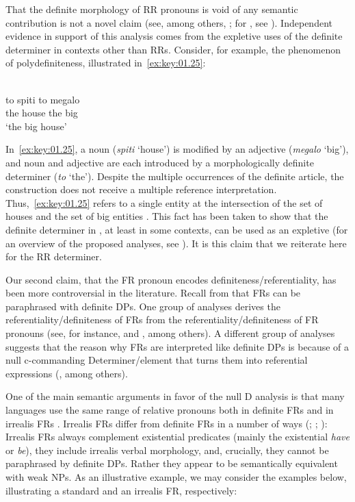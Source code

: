 \documentclass[output=paper]{langsci/langscibook}
\begin{document}
That the definite morphology of \gls{RR} pronouns is void of any semantic
contribution is not a novel claim (see, among others,
\citealt[80]{Bianchi1999}; for , see \citealt{Alexiadou1998}). Independent
evidence in support of this analysis comes from the expletive uses of the 
definite determiner in contexts other than \glspl{RR}.  Consider, for example, the
phenomenon of polydefiniteness, illustrated in~\eqref{ex:key:01.25}:

\ea {}\label{ex:key:01.25}\\
	\gll to    spiti   to   megalo\\
		the house the big\\
    \trans \enquote*{the big house}
\z

In~\eqref{ex:key:01.25}, a noun (\emph{spiti} ‘house’) is modified by an adjective
(\emph{megalo} ‘big’), and noun and adjective are each introduced by a
morphologically definite determiner (\emph{to} ‘the’).  Despite the multiple
occurrences of the definite article, the construction does not receive a
multiple reference interpretation. Thus,~\eqref{ex:key:01.25} refers to a single entity at the
intersection of the set of houses and the set of big entities
\parencite{LekSze2012}. This fact has been taken to show that the definite
determiner in , at least in some contexts, can be used as an expletive
(for an overview of the proposed analyses, see \citealt{Alexiadou2014b}). It is
this claim that we reiterate here for the \gls{RR} determiner.

Our second claim, that the \gls{FR} pronoun encodes
definiteness/referentiality, has been more controversial in the literature.
Recall from  that \glspl{FR} can be paraphrased with
definite DPs. One group of analyses derives the referentiality/definiteness of
\glspl{FR} from the referentiality/definiteness of \gls{FR} pronouns (see, for
instance, \citealt{Jacobson1995} and \citealt{Pancheva2000}, among others). A
different group of analyses suggests that the reason why \glspl{FR} are
interpreted like definite DPs is because of a null c-commanding
Determiner/element that turns them into referential expressions
(\citealt{GrovanRie1981,Caponigro2003,GroLan1998}, among others).

One of the main semantic arguments in favor of the null D analysis is that many
languages use the same range of relative pronouns both in definite \glspl{FR}
and in irrealis \glspl{FR} \citep{Caponigro2003}. Irrealis \glspl{FR} differ
from definite \glspl{FR} in a number of ways (\citealt{Caponigro2003};
\citealt{Pancheva2000}; \citealt{GroLan1998}): Irrealis \glspl{FR} always
complement existential predicates (mainly the existential \emph{have} or
\emph{be}), they include irrealis verbal morphology, and, crucially, they
cannot be paraphrased by definite DPs.  Rather they appear to be semantically
equivalent with weak NPs. As an illustrative example, we may consider the
 examples below, illustrating a standard and an irrealis \gls{FR},
respectively:
\end{document}
